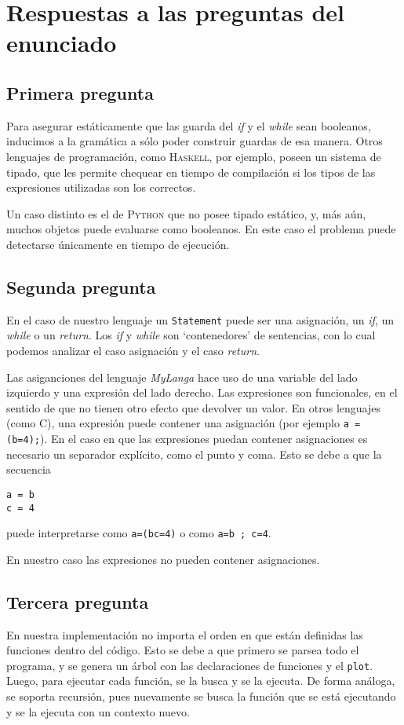\section{Respuestas a las preguntas del enunciado}

\subsection{Primera pregunta}

Para asegurar est\'aticamente que las guarda del \textit{if} y el
\textit{while} sean booleanos, inducimos a la gram\'atica a s\'olo poder
construir guardas de esa manera. Otros lenguajes de programaci\'on, 
como \textsc{Haskell}, por ejemplo, poseen un sistema de tipado, que les
permite chequear en tiempo de compilaci\'on si los tipos de las expresiones
utilizadas son los correctos.

Un caso distinto es el de \textsc{Python} que no posee tipado est\'atico,
y, m\'as a\'un, muchos objetos puede evaluarse como booleanos.
En este caso el problema puede detectarse \'unicamente en tiempo de
ejecuci\'on.

\subsection{Segunda pregunta}

En el caso de nuestro lenguaje un \texttt{Statement} puede ser una
asignaci\'on, un \textit{if}, un \textit{while} o un \textit{return}.
Los \textit{if} y \textit{while} son `contenedores' de sentencias, con lo cual
podemos analizar el caso asignaci\'on y el caso \textit{return}.

Las asiganciones del lenguaje \textit{MyLanga} hace uso de una variable
del lado izquierdo y una expresi\'on del lado derecho.
Las expresiones son funcionales, en el sentido de que no tienen otro efecto
que devolver un valor. En otros lenguajes (como \textsc{C}), una expresi\'on
puede contener una asignaci\'on (por ejemplo \texttt{a = (b=4);}).
En el caso en que las expresiones puedan contener asignaciones es necesario
un separador expl\'icito, como el punto y coma. Esto se debe a que la secuencia
\begin{verbatim}
a = b
c = 4
\end{verbatim}
puede interpretarse como \texttt{a=(bc=4)} o como
\texttt{a=b ; c=4}.

En nuestro caso las expresiones no pueden contener asignaciones.

\subsection{Tercera pregunta}
En nuestra implementaci\'on no importa el orden en que est\'an definidas las
funciones dentro del c\'odigo. Esto se debe a que primero se parsea todo
el programa, y se genera un \'arbol con las declaraciones de funciones
y el \texttt{plot}. Luego, para ejecutar cada funci\'on, se la busca
y se la ejecuta.
De forma an\'aloga, se soporta recursi\'on, pues nuevamente se busca la
funci\'on que se est\'a ejecutando y se la ejecuta con un contexto
nuevo.
